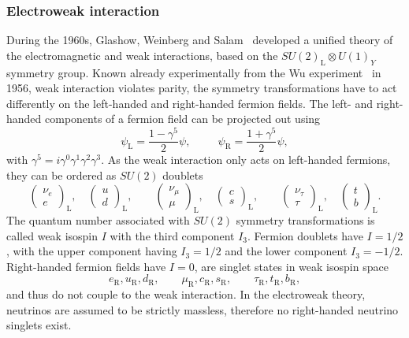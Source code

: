 \subsubsection{Electroweak interaction}
\label{sec:ewk_interaction}

During the 1960s, Glashow, Weinberg and Salam~\cite{GLASHOW1961579,PhysRevLett.19.1264,Salam1959} developed a unified theory of the electromagnetic and weak interactions, based on the $SU(2)_\mathrm{L}\otimes U(1)_Y$ symmetry group. Known already experimentally from the Wu experiment~\cite{PhysRev.105.1413} in 1956, weak interaction violates parity, \ie the symmetry transformations have to act differently on the left-handed and right-handed fermion fields. The left- and right-handed components of a fermion field can be projected out using
\begin{equation}
	\psi_\mathrm{L} = \frac{1-\gamma^5}{2}\psi , \ \ \qquad 	\psi_\mathrm{R} = \frac{1+\gamma^5}{2}\psi,
\end{equation}
with $\gamma^5 = i\gamma^0\gamma^1\gamma^2\gamma^3$. As the weak interaction only acts on left-handed fermions, they can be ordered as $SU(2)$ doublets
\begin{equation}
	\begin{pmatrix}
		\nu_e \\
		e
	\end{pmatrix}_\mathrm{L},
	\quad
	\begin{pmatrix}
		u \\
		d
	\end{pmatrix}_\mathrm{L},
	\qquad
	\begin{pmatrix}
		\nu_\mu \\
		\mu
	\end{pmatrix}_\mathrm{L},
	\quad
	\begin{pmatrix}
		c \\
		s
	\end{pmatrix}_\mathrm{L},
	\qquad
	\begin{pmatrix}
		\nu_\tau \\
		\tau
	\end{pmatrix}_\mathrm{L},
	\quad
	\begin{pmatrix}
		t \\
		b
	\end{pmatrix}_\mathrm{L}.
\end{equation} 
The quantum number associated with $SU(2)$ symmetry transformations is called weak isospin $I$ with the third component $I_3$. Fermion doublets have $I=1/2$, with the upper component having $I_3 = 1/2$ and the lower component $I_3=-1/2$. Right-handed fermion fields have $I=0$, \ie are singlet states in weak isospin space
\begin{equation}
	e_\mathrm{R},u_\mathrm{R},d_\mathrm{R}, \qquad \mu_\mathrm{R},c_\mathrm{R},s_\mathrm{R}, \qquad \tau_\mathrm{R},t_\mathrm{R},b_\mathrm{R}, 
\end{equation}
and thus do not couple to the weak interaction. In the electroweak theory, neutrinos are assumed to be strictly massless, therefore no right-handed neutrino singlets exist. 

